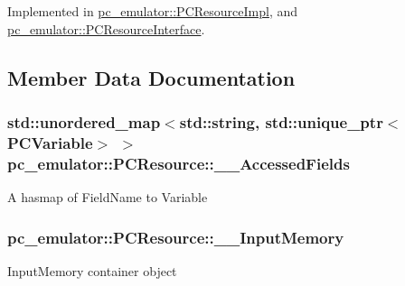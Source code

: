 Implemented in \hyperlink{classpc__emulator_1_1PCResourceImpl_ac3074be3fc6d79651d7921128c86aedb}{pc\+\_\+emulator\+::\+P\+C\+Resource\+Impl}, and \hyperlink{classpc__emulator_1_1PCResourceInterface_a480e635dc710a9ba4990d52659de910d}{pc\+\_\+emulator\+::\+P\+C\+Resource\+Interface}.



\subsection{Member Data Documentation}
\subsubsection[{\texorpdfstring{\+\_\+\+\_\+\+Accessed\+Fields}{__AccessedFields}}]{\setlength{\rightskip}{0pt plus 5cm}std\+::unordered\+\_\+map$<$std\+::string, std\+::unique\+\_\+ptr$<${\bf P\+C\+Variable}$>$ $>$ pc\+\_\+emulator\+::\+P\+C\+Resource\+::\+\_\+\+\_\+\+Accessed\+Fields}\hypertarget{classpc__emulator_1_1PCResource_acb5216de1a9e614bea458ad69564aa93}{}\label{classpc__emulator_1_1PCResource_acb5216de1a9e614bea458ad69564aa93}
A hasmap of Field\+Name to Variable 
\subsubsection[{\texorpdfstring{\+\_\+\+\_\+\+Input\+Memory}{__InputMemory}}]{ pc\+\_\+emulator\+::\+P\+C\+Resource\+::\+\_\+\+\_\+\+Input\+Memory}\hypertarget{classpc__emulator_1_1PCResource_a8581fead293ac0f5218bbc4de5241999}{}\label{classpc__emulator_1_1PCResource_a8581fead293ac0f5218bbc4de5241999}
Input\+Memory container object 
